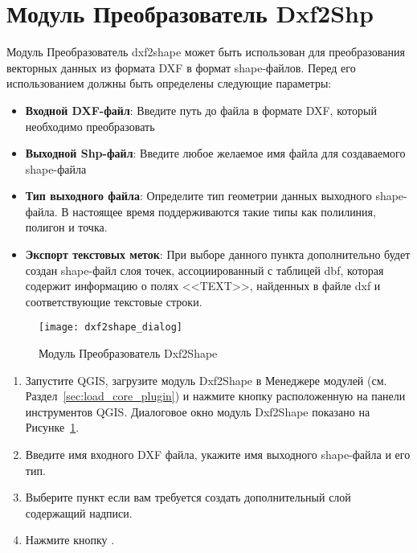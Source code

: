 
\section{Модуль Преобразователь Dxf2Shp}


Модуль Преобразователь dxf2shape может быть использован для преобразования
векторных данных из формата DXF в формат shape-файлов. Перед его
использованием должны быть определены следующие параметры:

\begin{itemize}
\item \textbf{Входной DXF-файл}: Введите путь до файла в формате DXF,
который необходимо преобразовать
\item \textbf{Выходной Shp-файл}: Введите любое желаемое имя файла для
создаваемого shape-файла
\item \textbf{Тип выходного файла}: Определите тип геометрии данных
выходного shape-файла. В настоящее время поддерживаются такие типы как
полилиния, полигон и точка.
\item \textbf{Экспорт текстовых меток}: При выборе данного пункта
дополнительно будет создан shape-файл слоя точек, ассоциированный с
таблицей dbf, которая содержит информацию о полях <<TEXT>>, найденных в
файле dxf и соответствующие текстовые строки.
\end{itemize}

\begin{figure}[ht]
   \centering
   \texttt{[image: dxf2shape\_dialog]}
   \caption{Модуль Преобразователь Dxf2Shape \nixcaption}\label{fig:dxf2shape_dialog}
\end{figure}


\begin{enumerate}
  \item Запустите QGIS, загрузите модуль Dxf2Shape в Менеджере модулей
  (см. Раздел~\ref{sec:load_core_plugin}) и нажмите кнопку
   расположенную на
  панели инструментов QGIS. Диалоговое окно модуль Dxf2Shape показано на
  Рисунке~\ref{fig:dxf2shape_dialog}.
  \item Введите имя входного DXF файла, укажите имя выходного shape-файла
  и его тип.
  \item Выберите пункт  если вам
  требуется создать дополнительный слой содержащий надписи.
  \item Нажмите кнопку .
\end{enumerate}

\FloatBarrier
